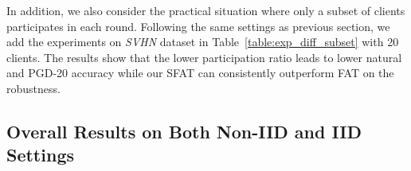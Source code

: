 \documentclass{article} %
\theoremstyle{plain}
\theoremstyle{definition}
\theoremstyle{remark}
\begin{document}
In addition, we also consider the practical situation where only a subset of clients participates in each round. Following the same settings as previous section, we add the experiments on \textit{SVHN} dataset in Table~\ref{table:exp_diff_subset} with 20 clients. The results show that the lower participation ratio leads to lower natural and PGD-20 accuracy while our SFAT can consistently outperform FAT on the robustness.



\subsection{Overall Results on Both Non-IID and IID Settings}
\label{app:overall_results}

\begin{table*}[ht]
\renewcommand\arraystretch{1.0}
\centering
\vspace{4mm}
\caption{Performance on three benchmark datasets under different federated optimization methods (Non-IID \& IID).}
\vspace{-1mm}
\label{table:exp_robust_eval_all_backup}
\end{table*}
\end{document}
